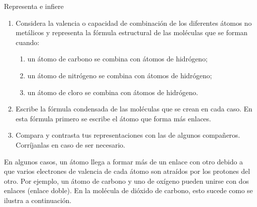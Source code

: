 \documentclass[11pt]{book}
\begin{document}
\begin{boxK}
  Representa e infiere
  \begin{enumerate}
    \item Considera la valencia o capacidad de combinación de los diferentes átomos no metálicos y representa la fórmula estructural de las moléculas que se forman cuando:
          \begin{enumerate}
            \item un átomo de carbono se combina con átomos de hidrógeno;
            \item un átomo de nitrógeno se combina con átomos de hidrógeno;
            \item un átomo de cloro se combina con átomos de hidrógeno.
          \end{enumerate}
    \item Escribe la fórmula condensada de las moléculas que se crean en cada caso. En esta fórmula primero se escribe el átomo que forma más enlaces.
    \item Compara y contrasta tus representaciones con las de algunos compañeros. Corríjanlas en caso de ser necesario.
  \end{enumerate}
\end{boxK}

En algunos casos, un átomo llega a formar más de un enlace con otro debido a que varios electrones de valencia de cada átomo son atraídos por los protones del otro. Por ejemplo, un átomo de carbono y uno de oxígeno pueden unirse con dos enlaces (enlace doble). En la molécula de dióxido de carbono, esto sucede como se ilustra a continuación.
\end{document}
